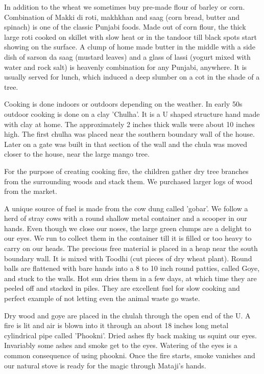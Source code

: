 In addition to the wheat we sometimes buy pre-made flour of barley or
corn. Combination of Makki di roti, makhkhan and saag (corn bread, butter
and spinach) is one of the classic Punjabi foods. Made out of corn flour,
the thick large roti cooked on skillet with slow heat or in the tandoor
till black spots start showing on the surface. A clump of home made butter
in the middle with a side dish of sarson da saag (mustard leaves) and
a glass of lassi (yogurt mixed with water and rock salt) is heavenly
combination for any Punjabi, anywhere. It is usually served for lunch,
which induced a deep slumber on a cot in the shade of a tree. 

Cooking is done indoors or outdoors depending on the weather. In early 50s
outdoor cooking is done on a clay 'Chulha'. It is a U shaped structure
hand made with clay at home. The approximately 2 inches thick walls were
about 10 inches high. The first chulha was placed near the southern
boundary wall of the house. Later on a gate was built in that section of
the wall and the chula was moved closer to the house, near the large mango
tree. 

For the purpose of creating cooking fire, the children gather dry tree
branches from the surrounding woods and stack them. We purchased larger
logs of wood from the market. 

A unique source of fuel is made from the cow dung called 'gobar'. We
follow a herd of stray cows with a round shallow metal container and
a scooper in our hands. Even though we close our noses, the large green
clumps are a delight to our eyes. We run to collect them in the container
till it is filled or too heavy to carry on our heads. The precious free
material is placed in a heap near the south boundary wall. It is mixed
with Toodhi (cut pieces of dry wheat plant). Round balls are flattened
with bare hands into a 8 to 10 inch round patties, called Goye, and stuck
to the walls. Hot sun dries them in a few days, at which time they are
peeled off and stacked in piles. They are excellent fuel for slow cooking
and perfect example of not letting even the animal waste go waste. 

Dry wood and goye are placed in the chulah through the open end of the U.
A fire is lit and air is blown into it through an about 18 inches long
metal cylindrical pipe called 'Phookni'. Dried ashes fly back making us
squint our eyes. Invariably some ashes and smoke get to the eyes. Watering
of the eyes is a common consequence of using phookni. Once the fire
starts, smoke vanishes and our natural stove is ready for the magic
through Mataji's hands. 

